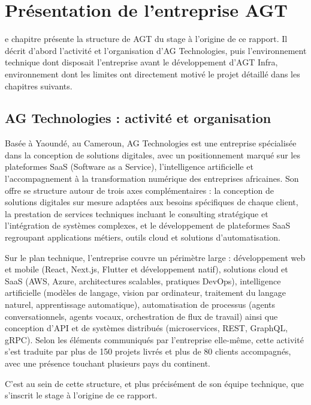 \chapter{Présentation de l'entreprise AGT}
\label{chap:entreprise}

e chapitre présente la structure de AGT du stage à
l'origine de ce rapport. Il décrit d'abord l'activité et l'organisation
d'AG Technologies, puis l'environnement technique dont disposait
l'entreprise avant le développement d'AGT Infra, environnement dont les
limites ont directement motivé le projet détaillé dans les chapitres
suivants.
\minisommaire

\section{AG Technologies : activité et organisation}

Basée à Yaoundé, au Cameroun, AG Technologies est une entreprise
spécialisée dans la conception de solutions digitales, avec un
positionnement marqué sur les plateformes SaaS (Software as a Service),
l'intelligence artificielle et l'accompagnement à la transformation
numérique des entreprises africaines. Son offre se structure autour de
trois axes complémentaires : la conception de solutions digitales sur
mesure adaptées aux besoins spécifiques de chaque client, la prestation de
services techniques incluant le consulting stratégique et l'intégration de
systèmes complexes, et le développement de plateformes SaaS regroupant
applications métiers, outils cloud et solutions d'automatisation.

Sur le plan technique, l'entreprise couvre un périmètre large : développement
web et mobile (React, Next.js, Flutter et développement natif), solutions
cloud et SaaS (AWS, Azure, architectures scalables, pratiques DevOps),
intelligence artificielle (modèles de langage, vision par ordinateur,
traitement du langage naturel, apprentissage automatique), automatisation
de processus (agents conversationnels, agents vocaux, orchestration de
flux de travail) ainsi que conception d'API et de systèmes distribués
(microservices, REST, GraphQL, gRPC). Selon les éléments communiqués par
l'entreprise elle-même, cette activité s'est traduite par plus de 150
projets livrés et plus de 80 clients accompagnés, avec une présence
touchant plusieurs pays du continent.

C'est au sein de cette structure, et plus précisément de son équipe
technique, que s'inscrit le stage à l'origine de ce rapport.

